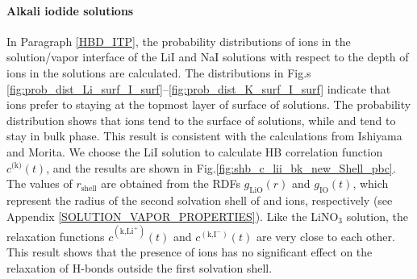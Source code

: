 
\FloatBarrier
\paragraph{Alkali iodide solutions}
In Paragraph \ref{HBD_ITP}, the probability distributions of ions in the solution/vapor interface of the LiI and NaI solutions with respect to the depth 
of ions in the solutions %
are calculated. 
The distributions in Fig.s \ref{fig:prob_dist_Li_surf_I_surf}--\ref{fig:prob_dist_K_surf_I_surf} indicate
that \I ions prefer to staying at the topmost layer of surface of solutions.
The probability distribution shows that \I ions tend to the surface of solutions, while \Na and \Li tend to stay in bulk phase. 
This result is consistent with the calculations from Ishiyama and Morita\cite{TI07,Ishiyama2014}.
We choose the LiI solution to calculate HB correlation function $c^\text{(k)}(t)$,
and the results are shown in Fig.\ref{fig:shb_c_lii_bk_new_Shell_pbc}. The values of $r_\text{shell}$ are obtained from
the RDFs $g_\text{LiO}(r)$ and $g_\text{IO}(t)$, which represent the radius of the second solvation shell of \Li and \I ions, respectively 
(see Appendix \ref{SOLUTION_VAPOR_PROPERTIES}). 
Like the LiNO$_3$ solution, the relaxation functions $c^{(\text{k,Li}^+)}(t)$ and 
$c^{(\text{k,I}^-)}(t)$ are very close to each other. 
This result shows that the presence of ions has no significant effect on the relaxation of H-bonds outside the first solvation shell.

